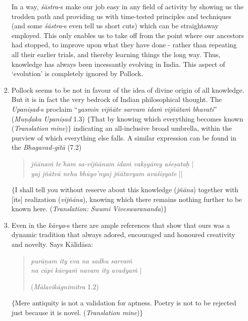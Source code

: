 \begin{enumerate}
In a way, {\it śāstra}-s make our job easy in any field of activity by showing us the trodden path and providing us with time-tested principles and techniques (and some {\it śāstra}-s even tell us short cuts) which can be straightaway employed. This only enables us to take off from the point where our ancestors had stopped, to improve upon what they have done - rather than repeating all their earlier trials, and thereby learning things the long way. Thus, knowledge has always been incessantly evolving in India. This aspect of `evolution' is completely ignored by Pollock.

\item Pollock seems to be not in favour of the idea of divine origin of all knowledge. But it is in fact the very bedrock of Indian philosophical thought. The {\it Upaniṣad}-s proclaim ``\textsl{yasmin vijñāte sarvam idaṁ vijñātaṁ bhavati}'' (\textsl{Muṇḍaka Upaniṣad} 1.3) $\{$That by knowing which everything becomes known (\textsl{Translation mine})$\}$ indicating an all-inclusive broad umbrella, within the purview of which everything else falls. A similar expression can be found in the \textsl{Bhagavad-gītā} (7.2)
\begin{quote}
{{\sl jñānaṁ te'ham sa-vijñānam idaṁ vakṣyāmy aśeṣataḥ}} |\\
{\sl yaj jñātvā neha bhūyo'nyaj jñātavyam avaśiṣyate} ||
\end{quote}
$\{$I shall tell you without reserve about this knowledge ({\it jñāna}) together with [its] realization ({\it vijñāna}), knowing which there remains nothing further to be known here. ({\em Translation: Swami Viveswarananda})$\}$

\item Even in the {\it kāvya}-s there are ample references that show that ours was a dynamic tradition that always adored, encouraged and honoured creativity and novelty. Says Kālidāsa:
\begin{quote}
{{\sl purāṇam ity eva na sadhu sarvaṁ}}\\
{{\sl na cāpi kāvyaṁ navam ity avadyaṁ}} | 

\hfill (\textsl{Mālavikāgnimitra}  1.2)
\end{quote}
$\{$Mere antiquity is not a validation for aptness. Poetry is not to be rejected just because it is novel. (\textsl{Translation mine})$\}$


\end{enumerate}
